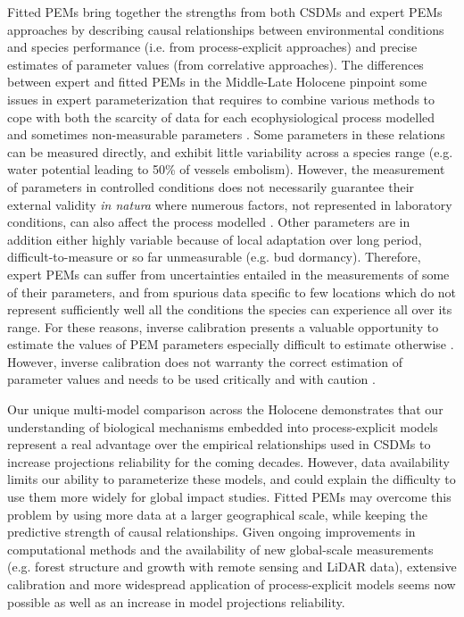 Fitted PEMs bring together the strengths from both CSDMs and expert PEMs approaches by describing causal relationships between environmental conditions and species performance (i.e. from process-explicit approaches) and precise estimates of parameter values (from correlative approaches). The differences between expert and fitted PEMs in the Middle-Late Holocene pinpoint some issues in expert parameterization that requires to combine various methods to cope with both the scarcity of data for each ecophysiological process modelled and sometimes non-measurable parameters \citep[e.g.][]{DeCaceres2023}.  Some parameters in these relations can be measured directly, and exhibit little variability across a species range (e.g. water potential leading to 50\% of vessels embolism). However, the measurement of parameters in controlled conditions does not necessarily guarantee their external validity \emph{in natura} \citep{Asse2020} where numerous factors, not represented in laboratory conditions, can also affect the process modelled \citep[but see][]{Satake2013}. Other parameters are in addition either highly variable because of local adaptation over long period,  difficult-to-measure or so far unmeasurable (e.g. bud dormancy). Therefore, expert PEMs can suffer from uncertainties entailed in the measurements of some of their parameters, and from spurious data specific to few locations which do not represent sufficiently well all the conditions the species can experience all over its range. For these reasons, inverse calibration presents a valuable opportunity to estimate the values of PEM parameters especially difficult to estimate otherwise \citep{Evans2016, Hartig2014}. However, inverse calibration does not warranty the correct estimation of parameter values and needs to be used critically and with caution \citep{VanderMeersch2023}. 

Our unique multi-model comparison across the Holocene demonstrates that our understanding of biological mechanisms embedded into process-explicit models represent a real advantage over the empirical relationships used in CSDMs to increase projections reliability for the coming decades. However, data availability limits our ability to parameterize these models, and could explain the difficulty to use them more widely for global impact studies. Fitted PEMs may overcome this problem by using more data at a larger geographical scale, while keeping the predictive strength of causal relationships. Given ongoing improvements in computational methods and the availability of new global-scale measurements (e.g. forest structure and growth with remote sensing and LiDAR data), extensive calibration and more widespread application of process-explicit models seems now possible as well as an increase in model projections reliability.

